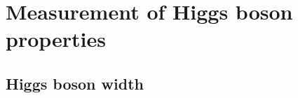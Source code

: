 \section{Measurement of Higgs boson properties} \label{sec:results}

\subsection{Higgs boson width} \label{sec:offshellwidth}




